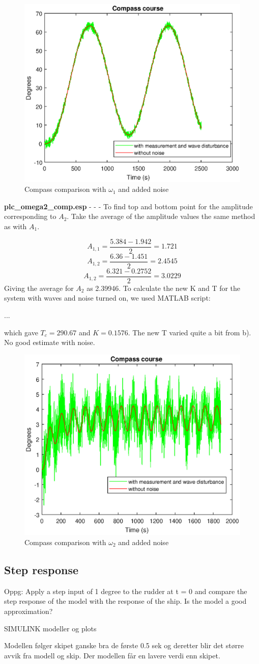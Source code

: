 \begin{figure}[H]
    \centering
    \includegraphics[width=0.5\linewidth]{Part1_pics/p1c_omega1_comp.eps}
    \caption{Compass comparison with $\omega_1$ and added noise}
    \label{fig:p1c1}
\end{figure}
\textbf{plc\_omega2\_comp.esp} - - - To find top and bottom point for the amplitude corresponding to $A_2$. Take the average of the amplitude values the same method as with $A_1$.

\begin{equation*}
    A_{1,1} = \frac{5.384 - 1.942}{2} = 1.721
\end{equation*}
\begin{equation*}
    A_{1,2} = \frac{6.36 - 1.451}{2} = 2.4545
\end{equation*}
\begin{equation*}
    A_{1,2} = \frac{6.321 - 0.2752}{2} = 3.0229
\end{equation*}
Giving the average for $A_2$ as 2.39946. To calculate the new K and T for the system with waves and noise turned on, we used MATLAB script:

...

which gave $T_c = 290.67$ and $K = 0.1576$. The new T varied quite a bit from b). No good estimate with noise. 
\begin{figure}[H]
    \centering
    \includegraphics[width=0.5\linewidth]{Part1_pics/p1c_omega2_comp.eps}
    \caption{Compass comparison with $\omega_2$ and added noise}
    \label{fig:p1c2}
\end{figure}

\subsection{Step response}
Oppg: Apply a step input of 1 degree to the rudder at t = 0 and compare the step response of the model with the response of the ship. Is the model a good approximation?
\bigskip

SIMULINK modeller og plots
\bigskip

Modellen følger skipet ganske bra de første 0.5 sek og deretter blir det større avvik fra modell og skip. Der modellen får en lavere verdi enn skipet. 
